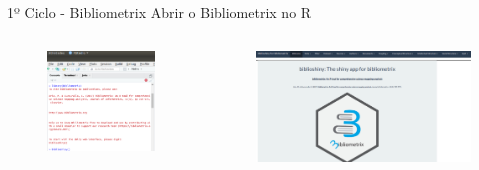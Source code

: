 \begin{frame}{1º Ciclo - Bibliometrix}
	Abrir o Bibliometrix no R
	\begin{columns}
		\begin{figure}[hb]
			\includegraphics[width=1\textwidth]{figures/bibliometrix/rbibliometrix.png}
		\end{figure}
		\begin{figure}[hb]
			\includegraphics[width=1\textwidth]{figures/bibliometrix/b1.png}
		\end{figure}
	\end{columns}
\end{frame}

